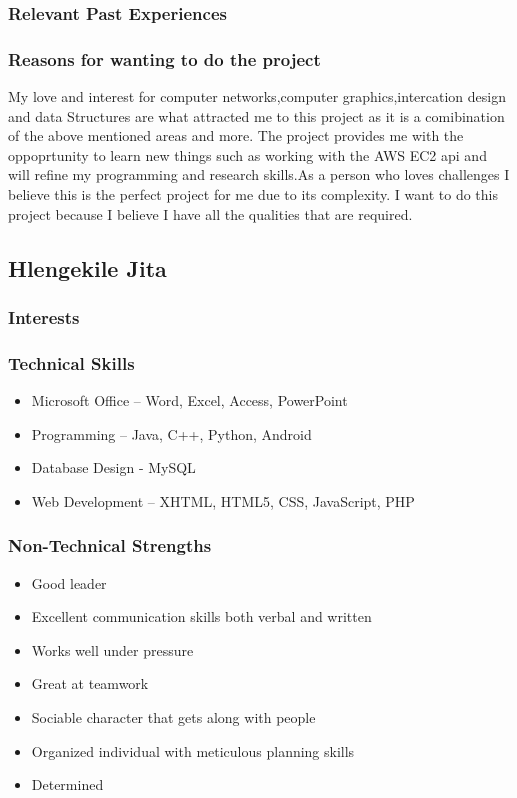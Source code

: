 \documentclass[a4paper,12pt]{article}
\begin{document}
\subsubsection{Relevant Past Experiences}
\subsubsection{Reasons for wanting to do the project}
\begin{flushleft}
My love and interest for computer networks,computer graphics,intercation design and data Structures are what attracted me to this project as it is a comibination of the above mentioned areas and more. The project provides me with the oppoprtunity to learn new things such as working with the AWS EC2 api and will refine my programming and research skills.As a person who loves challenges I believe this is the perfect project for me due to its complexity. I want to do this project because I believe I have all the qualities that are required.
\end{flushleft}
\subsection{Hlengekile Jita}
\subsubsection{Interests}
\subsubsection{Technical Skills}
\begin{itemize}
\item Microsoft Office – Word, Excel, Access, PowerPoint
\item Programming – Java, C++, Python, Android
\item Database Design - MySQL
\item Web Development – XHTML, HTML5, CSS, JavaScript, PHP
\end{itemize}
\subsubsection{Non-Technical Strengths}
\begin{itemize}
\item Good leader
\item Excellent communication skills both verbal and written
\item Works well under pressure
\item Great at teamwork
\item Sociable character that gets along with people
\item Organized individual with meticulous planning skills
\item Determined
\end{itemize}
\end{document}
